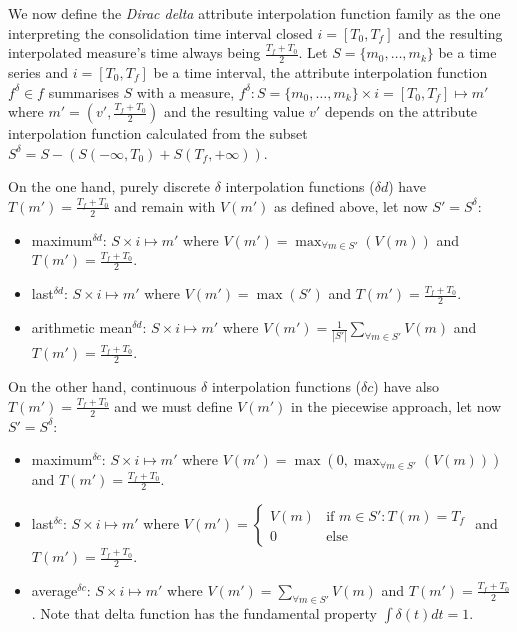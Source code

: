 We now define the \emph{Dirac delta} attribute interpolation function
family as the one interpreting the consolidation time interval closed
$i=[T_0,T_f]$ and the resulting interpolated measure's time always
being $\frac{T_f+T_0}{2}$.  Let $S=\{m_0,\ldots,m_k\}$ be a time
series and $i=[T_0,T_f]$ be a time interval, the attribute
interpolation function $f^{\delta}\in f$ summarises $S$ with a
measure, $f^{\delta}: S=\{m_0,\ldots,m_k\} \times i=[T_0,T_f] \mapsto
m'$ where $m'=(v',\frac{T_f+T_0}{2})$ and the resulting value
$v'$ depends on the attribute interpolation function calculated from
the subset $S^{\delta}=S-(S(-\infty,T_0)+S(T_f,+\infty))$.

On the one hand, purely discrete $\delta$ interpolation functions
($\delta d$) have $T(m')=\frac{T_f+T_0}{2}$ and remain with $V(m')$ as
defined above, let now $S'=S^{\delta}$:
\begin{itemize}
\item maximum$^{\delta d}$: $S \times i \mapsto m'$ where $V(m') =
  \max_{\forall m \in S'}(V(m))$ and $T(m')=\frac{T_f+T_0}{2}$.
\item last$^{\delta d}$: $S \times i \mapsto m'$ where $V(m') =
  \max(S')$ and $T(m')=\frac{T_f+T_0}{2}$.
\item arithmetic mean$^{\delta d}$: $S \times i \mapsto m'$ where $V(m')
  = \frac{1}{|S'|} \sum\limits_{\forall m\in S'} V(m)$ and
  $T(m')=\frac{T_f+T_0}{2}$. 
\end{itemize}
On the other hand, continuous $\delta$ interpolation functions
($\delta c$) have also $T(m')=\frac{T_f+T_0}{2}$ and we must define
$V(m')$ in the piecewise approach, let now $S'=S^{\delta}$:
\begin{itemize}
\item maximum$^{\delta c}$: $S \times i \mapsto m'$ where $V(m') = \max(0,
  \max_{\forall m \in S'}(V(m)))$ and $T(m')=\frac{T_f+T_0}{2}$.
\item last$^{\delta c}$: $S \times i \mapsto m'$ where $V(m') = 
\begin{cases}
V(m) & \text{if } m\in S':T(m)=T_f \\
0 & \text{else}
\end{cases}$ and $T(m')=\frac{T_f+T_0}{2}$.
\item average$^{\delta c}$: $S \times i \mapsto m'$ where $V(m') =
  \sum\limits_{\forall m \in S'} V(m)$ and
  $T(m')=\frac{T_f+T_0}{2}$. Note that delta function has the
  fundamental property $\int \delta(t)dt = 1$.
\end{itemize}

